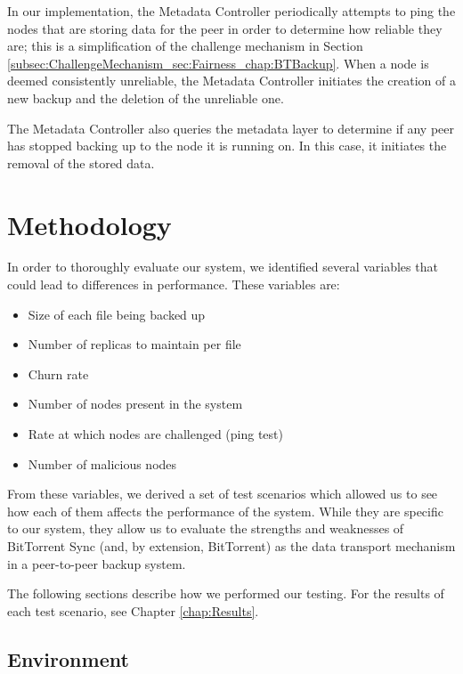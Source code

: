 \documentclass[12pt]{report}
\begin{document}
In our implementation, the Metadata Controller periodically attempts to ping the nodes that are storing data for the peer in order to determine how reliable they are; this is a simplification of the challenge mechanism in Section \ref{subsec:ChallengeMechanism_sec:Fairness_chap:BTBackup}. When a node is deemed consistently unreliable, the Metadata Controller initiates the creation of a new backup and the deletion of the unreliable one.


The Metadata Controller also queries the metadata layer to determine if any peer has stopped backing up to the node it is running on. In this case, it initiates the removal of the stored data.

\chapter{Methodology} \label{chap:Methodology}

In order to thoroughly evaluate our system, we identified several variables that could lead to differences in performance. These variables are:

\begin{itemize}
\item Size of each file being backed up
\item Number of replicas to maintain per file
\item Churn rate
\item Number of nodes present in the system
\item Rate at which nodes are challenged (ping test)
\item Number of malicious nodes
\end{itemize}

From these variables, we derived a set of test scenarios which allowed us to see how each of them affects the performance of the system. While they are specific to our system, they allow us to evaluate the strengths and weaknesses of BitTorrent Sync (and, by extension, BitTorrent) as the data transport mechanism in a peer-to-peer backup system.

The following sections describe how we performed our testing. For the results of each test scenario, see Chapter \ref{chap:Results}.

\section{Environment} \label{sec:Environment_chap:Methodology}
\end{document}
